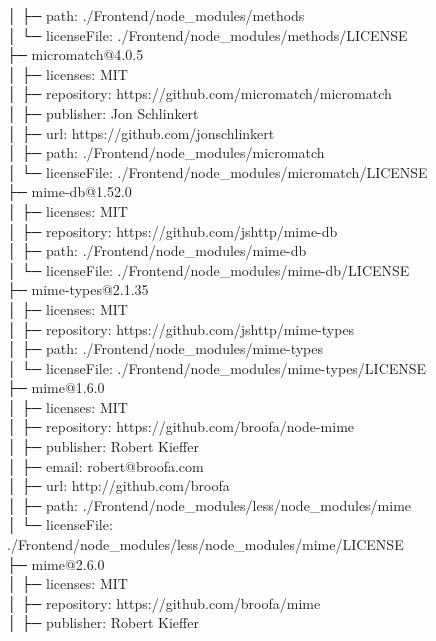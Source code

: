 \documentclass[
    paper=a4,
    twoside=false,
    parskip=half,
    listof=entryprefix,
    listof=totoc,
    index=totoc,
    bibliography=totoc,
    headsepline,
]{scrbook}
\begin{document}
    │  ├─ path: ./Frontend/node\_modules/methods\\
    │  └─ licenseFile: ./Frontend/node\_modules/methods/LICENSE\\
    ├─ micromatch@4.0.5\\
    │  ├─ licenses: MIT\\
    │  ├─ repository: https://github.com/micromatch/micromatch\\
    │  ├─ publisher: Jon Schlinkert\\
    │  ├─ url: https://github.com/jonschlinkert\\
    │  ├─ path: ./Frontend/node\_modules/micromatch\\
    │  └─ licenseFile: ./Frontend/node\_modules/micromatch/LICENSE\\
    ├─ mime-db@1.52.0\\
    │  ├─ licenses: MIT\\
    │  ├─ repository: https://github.com/jshttp/mime-db\\
    │  ├─ path: ./Frontend/node\_modules/mime-db\\
    │  └─ licenseFile: ./Frontend/node\_modules/mime-db/LICENSE\\
    ├─ mime-types@2.1.35\\
    │  ├─ licenses: MIT\\
    │  ├─ repository: https://github.com/jshttp/mime-types\\
    │  ├─ path: ./Frontend/node\_modules/mime-types\\
    │  └─ licenseFile: ./Frontend/node\_modules/mime-types/LICENSE\\
    ├─ mime@1.6.0\\
    │  ├─ licenses: MIT\\
    │  ├─ repository: https://github.com/broofa/node-mime\\
    │  ├─ publisher: Robert Kieffer\\
    │  ├─ email: robert@broofa.com\\
    │  ├─ url: http://github.com/broofa\\
    │  ├─ path: ./Frontend/node\_modules/less/node\_modules/mime\\
    │  └─ licenseFile: ./Frontend/node\_modules/less/node\_modules/mime/LICENSE\\
    ├─ mime@2.6.0\\
    │  ├─ licenses: MIT\\
    │  ├─ repository: https://github.com/broofa/mime\\
    │  ├─ publisher: Robert Kieffer\\
\end{document}
